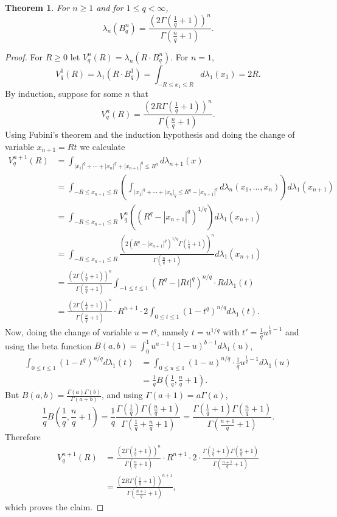 \documentclass{article}
\newtheorem{theorem}{Theorem}
\theoremstyle{definition}
\begin{document}
\begin{theorem}
For $n \geq 1$ and
for $1 \leq  q < \infty$,
\[
\lambda_n(B_q^n) =\frac{(2\Gamma(\frac{1}{q}+1))^n}{\Gamma(\frac{n}{q}+1)}.
\]
\end{theorem}
\begin{proof}
For $R \geq 0$ let $V_q^n(R) = \lambda_n(R \cdot B_q^n)$. 
For $n=1$,
\[
V_q^1(R) = \lambda_1(R \cdot B_q^1) = \int_{-R \leq x_1 \leq R} d\lambda_1(x_1)
=2R.
\]
By induction, suppose for some $n$ that
\[
V_q^n(R) = \frac{(2R \Gamma(\frac{1}{q}+1))^n}{\Gamma(\frac{n}{q}+1)}.
\]
Using Fubini's theorem and the induction hypothesis and doing the change of variable
$x_{n+1} = Rt$ we calculate
\begin{align*}
V_q^{n+1}(R)&=\int_{|x_1|^q+\cdots+|x_n|^q+|x_{n+1}|^q \leq R^q} d\lambda_{n+1}(x)\\
&=\int_{-R \leq x_{n+1} \leq R} \left( \int_{|x_1|^q+\cdots+|x_n|_q \leq R^q - |x_{n+1}|^q} d\lambda_n(x_1,\ldots,x_n)\right)
d\lambda_1(x_{n+1})\\
&=\int_{-R \leq x_{n+1} \leq R} V_q^n((R^q-|x_{n+1}|^q)^{1/q}) d\lambda_1(x_{n+1})\\
&=\int_{-R \leq x_{n+1} \leq R}  \frac{(2(R^q-|x_{n+1}|^q)^{1/q} \Gamma(\frac{1}{q}+1))^n}{\Gamma(\frac{n}{q}+1)}d\lambda_1(x_{n+1})\\
&=\frac{(2 \Gamma(\frac{1}{q}+1))^n}{\Gamma(\frac{n}{q}+1)} 
\int_{-1 \leq t \leq 1} (R^q-|Rt|^q)^{n/q} \cdot R d\lambda_1(t)\\
&=\frac{(2 \Gamma(\frac{1}{q}+1))^n}{\Gamma(\frac{n}{q}+1)}  \cdot R^{n+1} \cdot 2 \int_{0 \leq t \leq 1} (1-t^q)^{n/q} d\lambda_1(t).
\end{align*}
Now, doing the change of variable $u=t^q$, namely $t = u^{1/q}$ with $t' = \frac{1}{q} u^{\frac{1}{q}-1}$
and using the beta function $B(a,b) = \int_0^1 u^{a-1}(1-u)^{b-1} d\lambda_1(u)$,
\begin{align*}
\int_{0 \leq t \leq 1} (1-t^q)^{n/q} d\lambda_1(t)&=\int_{0 \leq u \leq 1} (1-u)^{n/q} \cdot  \frac{1}{q} u^{\frac{1}{q}-1} d\lambda_1(u)\\
&=\frac{1}{q} B\left(\frac{1}{q},\frac{n}{q}+1\right).
\end{align*}
But $B(a,b) = \frac{\Gamma(a) \Gamma(b)}{\Gamma(a+b)}$, and using $\Gamma(a+1)=a \Gamma(a)$, 
\[
\frac{1}{q} B\left(\frac{1}{q},\frac{n}{q}+1\right) = \frac{1}{q} \frac{\Gamma\left(\frac{1}{q}\right) \Gamma\left(\frac{n}{q}+1\right)}{\Gamma\left(\frac{1}{q}+\frac{n}{q}+1\right)}
=\frac{\Gamma\left(\frac{1}{q}+1\right) \Gamma\left( \frac{n}{q}+1\right)}{\Gamma\left(\frac{n+1}{q}+1\right)}.
\]
Therefore
\begin{align*}
V_q^{n+1}(R) &= \frac{(2 \Gamma(\frac{1}{q}+1))^n}{\Gamma(\frac{n}{q}+1)}  \cdot R^{n+1} \cdot 2 \cdot 
\frac{\Gamma\left(\frac{1}{q}+1\right) \Gamma\left( \frac{n}{q}+1\right)}{\Gamma\left(\frac{n+1}{q}+1\right)}\\
&=\frac{(2R\Gamma(\frac{1}{q}+1))^{n+1}}{\Gamma\left(\frac{n+1}{q}+1\right)},
\end{align*}
which proves the claim.
\end{proof}
\end{document}
